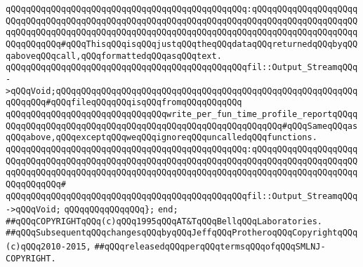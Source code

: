 \verb|qQQqqQQqqQQqqQQqqQQqqQQqqQQqqQQqqQQqqQQqqQQqqQQq:qQQqqQQqqQQqqQQqqQQqqQQqqQQqqQQqqQQqqQQqqQQqqQQqqQQqqQQqqQQqqQQqqQQqqQQqqQQqqQQqqQQqqQQqqQQqqQQqqQQqqQQqqQQqqQQqqQQqqQQqqQQqqQQqqQQqqQQqqQQqqQQqqQQqqQQqqQQqqQQqqQQqqQQqqQQq#qQQqThisqQQqisqQQqjustqQQqtheqQQqdataqQQqreturnedqQQqbyqQQqaboveqQQqcall,qQQqformattedqQQqasqQQqtext.|\newline
\verb|qQQqqQQqqQQqqQQqqQQqqQQqqQQqqQQqqQQqqQQqqQQqqQQqfil::Output_StreamqQQq->qQQqVoid;qQQqqQQqqQQqqQQqqQQqqQQqqQQqqQQqqQQqqQQqqQQqqQQqqQQqqQQqqQQqqQQqqQQq#qQQqfileqQQqqQQqisqQQqfromqQQqqQQqqQQq|\newline
\newline
\verb|qQQqqQQqqQQqqQQqqQQqqQQqqQQqqQQqwrite_per_fun_time_profile_reportqQQqqQQqqQQqqQQqqQQqqQQqqQQqqQQqqQQqqQQqqQQqqQQqqQQqqQQqqQQq#qQQqSameqQQqasqQQqabove,qQQqexceptqQQqweqQQqignoreqQQquncalledqQQqfunctions.|\newline
\verb|qQQqqQQqqQQqqQQqqQQqqQQqqQQqqQQqqQQqqQQqqQQqqQQq:qQQqqQQqqQQqqQQqqQQqqQQqqQQqqQQqqQQqqQQqqQQqqQQqqQQqqQQqqQQqqQQqqQQqqQQqqQQqqQQqqQQqqQQqqQQqqQQqqQQqqQQqqQQqqQQqqQQqqQQqqQQqqQQqqQQqqQQqqQQqqQQqqQQqqQQqqQQqqQQqqQQqqQQqqQQq#|\newline
\verb|qQQqqQQqqQQqqQQqqQQqqQQqqQQqqQQqqQQqqQQqqQQqqQQqfil::Output_StreamqQQq->qQQqVoid;|\newline
\newline
\newline
\verb|qQQqqQQqqQQqqQQq};|\newline
\verb|end;|\newline
\newline
\newline
\verb|##qQQqCOPYRIGHTqQQq(c)qQQq1995qQQqAT&TqQQqBellqQQqLaboratories.|\newline
\verb|##qQQqSubsequentqQQqchangesqQQqbyqQQqJeffqQQqProtheroqQQqCopyrightqQQq(c)qQQq2010-2015,|\newline
\verb|##qQQqreleasedqQQqperqQQqtermsqQQqofqQQqSMLNJ-COPYRIGHT.|\newline

